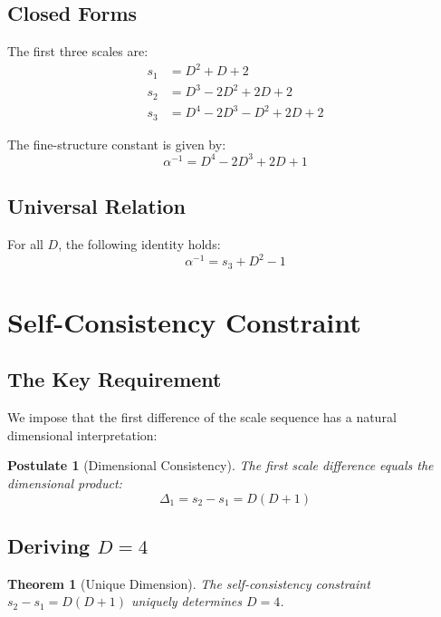 \documentclass[12pt,a4paper]{article}
\newtheorem{theorem}{Theorem}[section]
\newtheorem{postulate}{Postulate}
\begin{document}
\subsection{Closed Forms}

The first three scales are:
\begin{align}
s_1 &= D^2 + D + 2 \\
s_2 &= D^3 - 2D^2 + 2D + 2 \\
s_3 &= D^4 - 2D^3 - D^2 + 2D + 2
\end{align}

The fine-structure constant is given by:
\begin{equation}
\alpha^{-1} = D^4 - 2D^3 + 2D + 1
\end{equation}

\subsection{Universal Relation}

For all $D$, the following identity holds:
\begin{equation}
\alpha^{-1} = s_3 + D^2 - 1
\end{equation}

\section{Self-Consistency Constraint}

\subsection{The Key Requirement}

We impose that the first difference of the scale sequence has a natural dimensional interpretation:

\begin{postulate}[Dimensional Consistency]
The first scale difference equals the dimensional product:
\begin{equation}
\Delta_1 = s_2 - s_1 = D(D+1)
\end{equation}
\end{postulate}

\subsection{Deriving $D = 4$}

\begin{theorem}[Unique Dimension]
The self-consistency constraint $s_2 - s_1 = D(D+1)$ uniquely determines $D = 4$.
\end{theorem}
\end{document}
